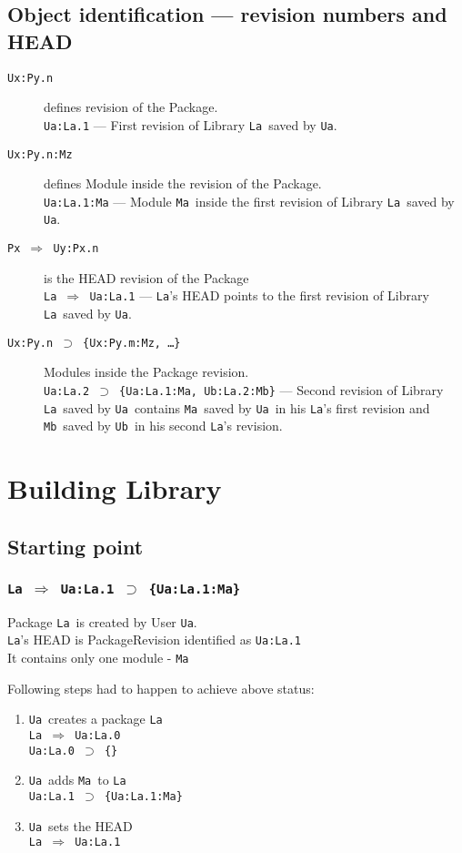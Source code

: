 \documentclass[10pt]{article}
\def\Ua{{\tt Ua}}
\def\Ub{{\tt Ub}}
\def\La{{\tt La}}
\def\Ma{{\tt Ma}}
\def\Mb{{\tt Mb}}
\def\headsto{${\Longrightarrow}$ }
\def\hto{\headsto}
\def\eq{${\supset}$ }
\begin{document}
	\subsection{Object identification --- revision numbers and HEAD}
	\begin{description}
		\item[{\tt Ux:Py.n}] defines revision of the Package.\\ 
			{\tt Ua:La.1} --- First revision of Library \La\ saved by \Ua.
		\item[{\tt Ux:Py.n:Mz}] defines Module inside the revision of the Package. \\ 
			{\tt Ua:La.1:Ma} --- Module \Ma\ inside the first revision of Library \La\ saved by \Ua.
		\item[{\tt Px \hto  Uy:Px.n}] is the HEAD revision of the Package\\ 
			{\tt La \hto  Ua:La.1} --- \La's HEAD points to the first revision of Library \La\ saved by \Ua.
		\item[{\tt Ux:Py.n \eq \{Ux:Py.m:Mz, \ldots\}}] Modules inside the Package revision.\\ 
			{\tt Ua:La.2 \eq \{Ua:La.1:Ma, Ub:La.2:Mb\}} --- Second revision of Library \La\ saved by \Ua\ contains \Ma\ saved by \Ua\ in his \La's first revision and \Mb\ saved by \Ub\ in his second \La's revision.
	\end{description}

\section{Building Library}

	\subsection{Starting point}

		\subsubsection*{{\tt La \hto  Ua:La.1 \eq \{Ua:La.1:Ma\}}}
			Package \La\ is created by User \Ua.\\
			\La's HEAD is PackageRevision identified as {\tt Ua:La.1}\\
			It contains only one module - \Ma
			
			\noindent Following steps had to happen to achieve above status:
			\begin{enumerate}
				\item{\Ua\ creates a package \La\\
				    {\tt La \hto  Ua:La.0} \\
				    {\tt Ua:La.0 \eq \{\}}
				}
				\item{\Ua\ adds \Ma\ to \La\\
					{\tt Ua:La.1 \eq \{Ua:La.1:Ma\}}
				}
				\item{\Ua\ sets the HEAD\\
					{\tt La \hto  Ua:La.1}
				}
			\end{enumerate}
			
\end{document}
